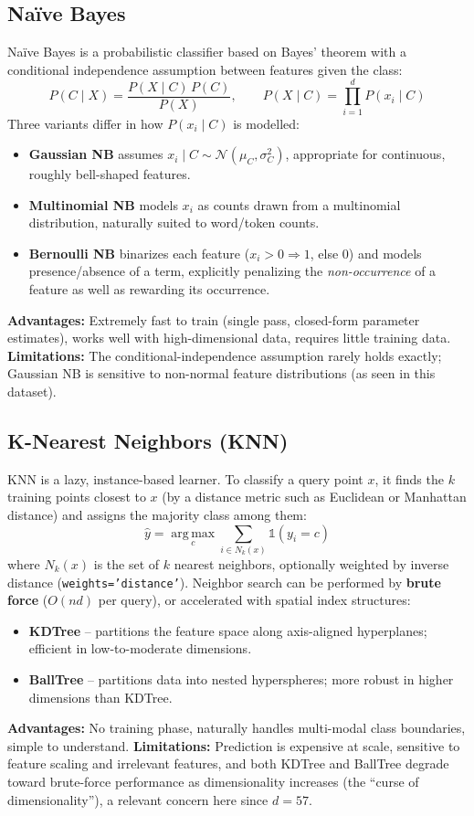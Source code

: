 \documentclass[12pt,a4paper]{article}
\begin{document}
\subsection*{Na\"ive Bayes}
Na\"ive Bayes is a probabilistic classifier based on Bayes' theorem with a conditional
independence assumption between features given the class:
\[
P(C \mid X) = \frac{P(X \mid C)\,P(C)}{P(X)}, \qquad
P(X\mid C) = \prod_{i=1}^{d} P(x_i \mid C)
\]
Three variants differ in how $P(x_i \mid C)$ is modelled:
\begin{itemize}
\item \textbf{Gaussian NB} assumes $x_i \mid C \sim \mathcal{N}(\mu_C, \sigma_C^2)$,
appropriate for continuous, roughly bell-shaped features.
\item \textbf{Multinomial NB} models $x_i$ as counts drawn from a multinomial
distribution, naturally suited to word/token counts.
\item \textbf{Bernoulli NB} binarizes each feature ($x_i > 0 \Rightarrow 1$, else $0$)
and models presence/absence of a term, explicitly penalizing the \emph{non-occurrence}
of a feature as well as rewarding its occurrence.
\end{itemize}
\textbf{Advantages:} Extremely fast to train (single pass, closed-form parameter
estimates), works well with high-dimensional data, requires little training data.
\textbf{Limitations:} The conditional-independence assumption rarely holds exactly;
Gaussian NB is sensitive to non-normal feature distributions (as seen in this dataset).

\subsection*{K-Nearest Neighbors (KNN)}
KNN is a lazy, instance-based learner. To classify a query point $x$, it finds the $k$
training points closest to $x$ (by a distance metric such as Euclidean or Manhattan
distance) and assigns the majority class among them:
\[
\hat{y} = \operatorname*{arg\,max}_{c} \sum_{i \in N_k(x)} \mathbb{1}(y_i = c)
\]
where $N_k(x)$ is the set of $k$ nearest neighbors, optionally weighted by inverse
distance (\texttt{weights='distance'}). Neighbor search can be performed by
\textbf{brute force} ($O(nd)$ per query), or accelerated with spatial index structures:
\begin{itemize}
\item \textbf{KDTree} -- partitions the feature space along axis-aligned hyperplanes;
efficient in low-to-moderate dimensions.
\item \textbf{BallTree} -- partitions data into nested hyperspheres; more robust in
higher dimensions than KDTree.
\end{itemize}
\textbf{Advantages:} No training phase, naturally handles multi-modal class boundaries,
simple to understand. \textbf{Limitations:} Prediction is expensive at scale, sensitive
to feature scaling and irrelevant features, and both KDTree and BallTree degrade toward
brute-force performance as dimensionality increases (the ``curse of dimensionality''),
a relevant concern here since $d = 57$.
\end{document}

